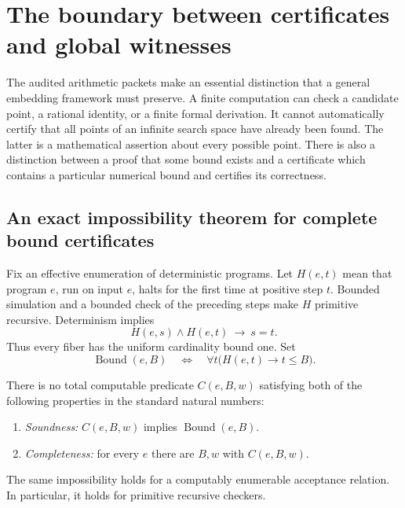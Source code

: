 \section{The boundary between certificates and global witnesses}
\label{sec:certificate-boundary}

The audited arithmetic packets \cite{faltings,siegel,mordell,roth,prime} make an essential distinction that a general
embedding framework must preserve. A finite computation can check a
candidate point, a rational identity, or a finite formal derivation.
It cannot automatically certify that all points of an infinite search
space have already been found. The latter is a mathematical assertion
about every possible point. There is also a distinction between a proof
that some bound exists and a certificate which contains a particular
numerical bound and certifies its correctness.

\subsection{An exact impossibility theorem for complete bound certificates}

Fix an effective enumeration of deterministic programs. Let $H(e,t)$ mean
that program $e$, run on input $e$, halts for the first time at positive
step $t$. Bounded simulation and a bounded check of the preceding steps
make $H$ primitive recursive. Determinism implies
\[
 H(e,s)\wedge H(e,t)\ \longrightarrow\ s=t.
\]
Thus every fiber has the uniform cardinality bound one. Set
\[
 \operatorname{Bound}(e,B)
   \quad\Longleftrightarrow\quad
 \forall t\bigl(H(e,t)\longrightarrow t\le B\bigr).
\]

\begin{theorem}
\label{thm:no-complete-bound-certificates}
There is no total computable predicate $C(e,B,w)$ satisfying both of the
following properties in the standard natural numbers:
\begin{enumerate}
\item \emph{Soundness:} $C(e,B,w)$ implies
      $\operatorname{Bound}(e,B)$.
\item \emph{Completeness:} for every $e$ there are $B,w$ with $C(e,B,w)$.
\end{enumerate}
The same impossibility holds for a computably enumerable acceptance
relation. In particular, it holds for primitive recursive checkers.
\end{theorem}

